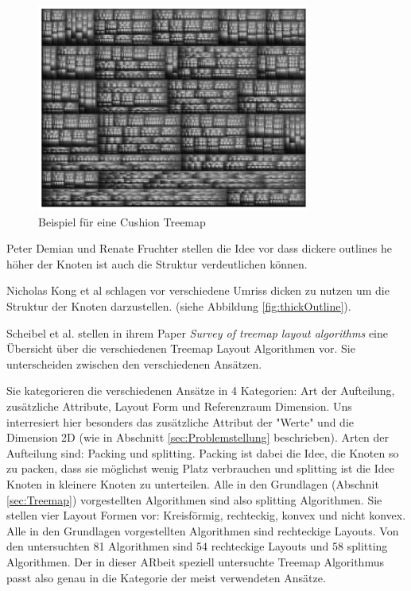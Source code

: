 \begin{figure}
    \centering
    \includegraphics[width=0.8\textwidth]{images/cushionTreemap.png}
    \caption{Beispiel für eine Cushion Treemap \cite[4]{cushionTreemaps}}
    \label{fig:cushion}
\end{figure}

Peter Demian und Renate Fruchter stellen die Idee vor dass dickere outlines he höher der Knoten ist auch die Struktur verdeutlichen können. 

Nicholas Kong et al schlagen vor verschiedene Umriss dicken zu nutzen um die Struktur der Knoten darzustellen.\cite{2010-perception-treemaps} (siehe Abbildung \ref{fig:thickOutline}).


Scheibel et al. stellen in ihrem Paper \textit{Survey of treemap layout algorithms}\cite{scheibel2020survey} eine Übersicht über die verschiedenen Treemap Layout Algorithmen vor. Sie unterscheiden zwischen den verschiedenen Ansätzen. 

Sie kategorieren die verschiedenen Ansätze in 4 Kategorien: Art der Aufteilung, zusätzliche Attribute, Layout Form und Referenzraum Dimension. 
Uns interresiert hier besonders das zusätzliche Attribut der "Werte" und die Dimension 2D (wie in Abschnitt \ref{sec:Problemstellung} beschrieben).
Arten der Aufteilung sind: Packing und splitting. Packing ist dabei die Idee, die Knoten so zu packen, dass sie möglichst wenig Platz verbrauchen und splitting ist die Idee Knoten in kleinere Knoten zu unterteilen. Alle in den Grundlagen (Abschnit \ref{sec:Treemap}) vorgestellten Algorithmen sind also splitting Algorithmen.
Sie stellen vier Layout Formen vor: Kreisförmig, rechteckig, konvex und nicht konvex. Alle in den Grundlagen vorgestellten Algorithmen sind rechteckige Layouts.
Von den untersuchten 81 Algorithmen sind 54 rechteckige Layouts und 58 splitting Algorithmen. Der in dieser ARbeit speziell untersuchte Treemap Algorithmus passt also genau in die Kategorie der meist verwendeten Ansätze.


